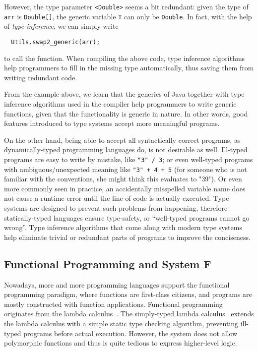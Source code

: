 However, the type parameter \verb|<Double>| seems a bit redundant:
given the type of \verb|arr| is \verb|Double[]|,
the generic variable \verb|T| can only be \verb|Double|.
In fact, with the help of \emph{type inference},
we can simply write
\begin{verbatim}
  Utils.swap2_generic(arr);
\end{verbatim}
to call the function.
When compiling the above code,
type inference algorithms help programmers to fill in the missing type automatically,
thus saving them from writing redundant code.

From the example above, we learn that the generics of Java
together with type inference algorithms used in the compiler
help programmers to write generic functions,
given that the functionality is generic in nature.
In other words, good features introduced to type systems
accept more meaningful programs.

On the other hand, being able to accept all syntactically correct programs,
as dynamically-typed programming languages do,
is not desirable as well.
Ill-typed programs are easy to write by mistake, like \verb|"3" / 3|;
or even well-typed programs with ambiguous/unexpected meaning like \verb|"3" + 4 + 5|
(for someone who is not familiar with the conventions, she might think this evaluates to "39").
Or even more commonly seen in practice,
an accidentally misspelled variable name does not cause a runtime error until
the line of code is actually executed.
Type systems are designed to prevent such problems from happening,
therefore statically-typed languages
ensure type-safety, or ``well-typed programs cannot go wrong''.
Type inference algorithms that come along with modern type systems
help eliminate trivial or redundant parts of programs to
improve the conciseness.

\subsection{Functional Programming and System F}
Nowadays, more and more programming languages support the functional programming paradigm,
where functions are first-class citizens,
and programs are mostly constructed with function applications.
Functional programming originates from the
lambda calculus~\citep{alonzo1932lambda}.
The simply-typed lambda calculus~\citep{church1941calculi} extends the lambda calculus with
a simple static type checking algorithm,
preventing ill-typed programs before actual execution.
However, the system does not allow polymorphic functions and
thus is quite tedious to express higher-level logic.

